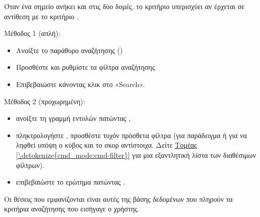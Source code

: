 \documentclass[letterpaper,10pt,greek]{sphinxmanual}
\begin{document}
\sphinxAtStartPar
Όταν ένα σημείο ανήκει και στις δύο δομές, το κριτήριο  υπερισχύει αν έρχεται σε αντίθεση με το κριτήριο .

\sphinxAtStartPar
Μέθοδος 1 (απλή):
\begin{itemize}
\item {} 
\sphinxAtStartPar
Ανοίξτε το παράθυρο αναζήτησης ()

\item {} 
\sphinxAtStartPar
Προσθέστε και ρυθμίστε τα φίλτρα αναζήτησης

\item {} 
\sphinxAtStartPar
Επιβεβαιώστε κάνοντας κλικ στο «Search».

\end{itemize}

\sphinxAtStartPar
Μέθοδος 2 (προχωρημένη):
\begin{itemize}
\item {} 
\sphinxAtStartPar
ανοίξτε τη γραμμή εντολών πατώντας ,

\item {} 
\sphinxAtStartPar
πληκτρολογήστε , προσθέστε τυχόν πρόσθετα φίλτρα (για παράδειγμα  ή  για να ληφθεί υπόψη ο κύβος και το σκορ αντίστοιχα. Δείτε \hyperref[\detokenize{cmd_mode:cmd-filter}]{Τομέας \ref{\detokenize{cmd_mode:cmd-filter}}} για μια εξαντλητική λίστα των διαθέσιμων φίλτρων).

\item {} 
\sphinxAtStartPar
επιβεβαιώστε το ερώτημα πατώντας .

\end{itemize}

\sphinxAtStartPar
Οι θέσεις που εμφανίζονται είναι αυτές της βάσης δεδομένων που πληρούν τα κριτήρια αναζήτησης που εισήγαγε ο χρήστης.
\end{document}

